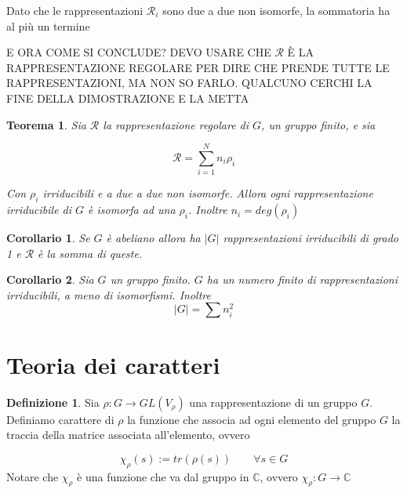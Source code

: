 \documentclass[11pt]{article}
\theoremstyle{plain}
\newtheorem{thm}{Teorema}[section]
\newtheorem*{cor}{Corollario}
\theoremstyle{definition}
\newtheorem{defn}{Definizione}[section]
\theoremstyle{remark}
\newcommand{\C}{\mathbb{C}}
\newcommand{\dsum}{\displaystyle\sum}
\begin{document}
Dato che le rappresentazioni $\mathcal{R}_i$ sono due a due non isomorfe, la sommatoria ha al più un termine


E ORA COME SI CONCLUDE? DEVO USARE CHE $\mathcal{R}$ È LA RAPPRESENTAZIONE REGOLARE PER DIRE CHE PRENDE TUTTE LE RAPPRESENTAZIONI, MA NON SO FARLO. QUALCUNO CERCHI LA FINE DELLA DIMOSTRAZIONE E LA METTA






\begin{thm}
Sia $\mathcal{R}$ la rappresentazione regolare di $G$, un gruppo finito, e sia 

\[ \mathcal{R} = \dsum_{i=1}^Nn_i \rho_i\]

Con $\rho_i$ irriducibili e a due a due non isomorfe. Allora ogni rappresentazione irriducibile di $G$ è isomorfa ad una $\rho_i$. Inoltre $n_i = deg(\rho_i)$ 
\label{thm: teorema importantissimo}
\end{thm}














\begin{cor}
Se $G$ è abeliano allora ha $|G|$ rappresentazioni irriducibili di grado 1 e $\mathcal{R}$ è la somma di queste.
\end{cor}



\begin{cor}
Sia $G$ un gruppo finito. $G$ ha un numero finito di rappresentazioni irriducibili, a meno di isomorfismi. Inoltre
\[|G| = \dsum n_i^2\]
\end{cor}



















\newpage
\section{Teoria dei caratteri}


\begin{defn}
Sia $\rho: G \to GL(V_\rho)$ una rappresentazione di un gruppo $G$. Definiamo carattere di $\rho$ la funzione che associa ad ogni elemento del gruppo $G$ la traccia della matrice associata all'elemento, ovvero

\[\chi_\rho(s) := tr (\rho(s)) \qquad \forall s \in G \]
Notare che $\chi_{\rho}$ è una funzione che va dal gruppo in $\C$, ovvero $\chi_{\rho}: G \to \C$

\end{defn}
\end{document}
